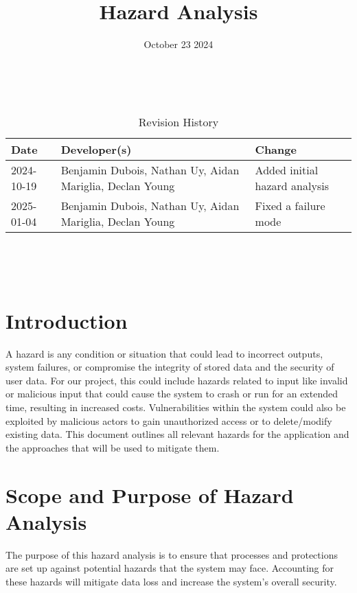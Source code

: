 \documentclass{article}
\title{Hazard Analysis\\\progname}
\author{\authname}
\date{October 23 2024}
\begin{document}
\maketitle
\thispagestyle{empty}

~\newpage


\begin{table}[hp]
\caption{Revision History} \label{TblRevisionHistory}
\begin{tabularx}{\textwidth}{llX}
\toprule
\textbf{Date} & \textbf{Developer(s)} & \textbf{Change}\\
\midrule
2024-10-19 & Benjamin Dubois, Nathan Uy, Aidan Mariglia, Declan Young & Added initial hazard analysis\\
\midrule
2025-01-04 & Benjamin Dubois, Nathan Uy, Aidan Mariglia, Declan Young & Fixed a failure mode\\
\bottomrule
\end{tabularx}
\end{table}

~\newpage

\tableofcontents

\listoftables

\listoffigures

~\newpage


\section{Introduction}

A hazard is any condition or situation that could lead to incorrect outputs, system failures, or compromise the integrity of stored data and the security of user data. For our project, this could include hazards related to input like invalid or malicious input that could cause the system to crash or run for an extended time, resulting in increased costs. Vulnerabilities within the system could also be exploited by malicious actors to gain unauthorized access or to delete/modify existing data. This document outlines all relevant hazards for the application and the approaches that will be used to mitigate them.

\section{Scope and Purpose of Hazard Analysis}

The purpose of this hazard analysis is to ensure that processes and protections are set up against potential hazards that the system may face. Accounting for these hazards will mitigate data loss and increase the system's overall security. 
\end{document}
